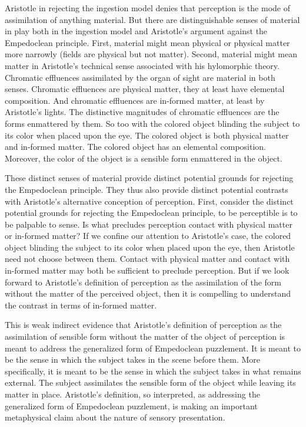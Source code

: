 Aristotle in rejecting the ingestion model denies that perception is the mode of assimilation of anything material. But there are distinguishable senses of material in play both in the ingestion model and Aristotle's argument against the Empedoclean principle. First, material might mean physical or physical matter more narrowly (fields are physical but not matter). Second, material might mean matter in Aristotle's technical sense associated with his hylomorphic theory. Chromatic effluences assimilated by the organ of sight are material in both senses. Chromatic effluences are physical matter, they at least have elemental composition. And chromatic effluences are in-formed matter, at least by Aristotle's lights. The distinctive magnitudes of chromatic effluences are the forms enmattered by them. So too with the colored object blinding the subject to its color when placed upon the eye. The colored object is both physical matter and in-formed matter. The colored object has an elemental composition. Moreover, the color of the object is a sensible form enmattered in the object.

These distinct senses of material provide distinct potential grounds for rejecting the Empedoclean principle. They thus also provide distinct potential contrasts with Aristotle's alternative conception of perception. First, consider the distinct potential grounds for rejecting the Empedoclean principle, to be perceptible is to be palpable to sense. Is what precludes perception contact with physical matter or in-formed matter? If we confine our attention to Aristotle's case, the colored object blinding the subject to its color when placed upon the eye, then Aristotle need not choose between them. Contact with physical matter and contact with in-formed matter may both be sufficient to preclude perception. But if we look forward to Aristotle's definition of perception as the assimilation of the form without the matter of the perceived object, then it is compelling to understand the contrast in terms of in-formed matter. 

This is weak indirect evidence that Aristotle's definition of perception as the assimilation of sensible form without the matter of the object of perception is meant to address the generalized form of Empedoclean puzzlement. It is meant to be the sense in which the subject takes in the scene before them. More specifically, it is meant to be the sense in which the subject takes in what remains external. The subject assimilates the sensible form of the object while leaving its matter in place. Aristotle's definition, so interpreted, as addressing the generalized form of Empedoclean puzzlement, is making an important metaphysical claim about the nature of sensory presentation.




